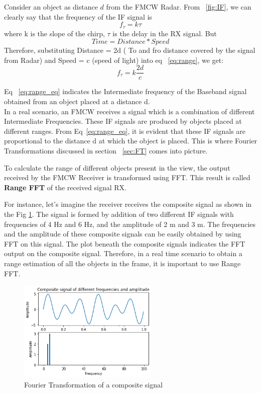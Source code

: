 Consider an object as distance $d$ from the FMCW Radar. From ~\ref{fig:IF}, we can clearly say that the frequency of the IF signal is 
\begin{equation}\label{eq:range}
    f_{\tau}= k\tau
\end{equation}
where k is the slope of the chirp, $\tau$ is the delay in the RX signal.
But 
\begin{equation}
    Time = Distance*Speed
\end{equation}
Therefore, substituting Distance = 2d ( To and fro distance covered by the signal from Radar) and Speed = c (speed of light) into eq ~\ref{eq:range}, we get:
\begin{equation}\label{eq:range_eq}
f_{\tau}= k\frac{2d}{c}   
\end{equation}

Eq ~\ref{eq:range_eq} indicates the Intermediate frequency of the Baseband signal obtained from an object placed at a distance d.
\\


In a real scenario, an FMCW receives a signal which is a combination of different Intermediate Frequencies. These IF signals are produced by objects placed at different ranges. From Eq~\ref{eq:range_eq}, it is evident that these IF signals are proportional to the distance d at which the object is placed.
This is where Fourier Transformations discussed in section ~\ref{sec:FT} comes into picture.

To calculate the range of different objects present in the view, the output received by the FMCW Receiver is transformed using FFT. This result is called \textbf{Range FFT} of the received signal RX.

For instance, let's imagine the receiver receives the composite signal as shown in the Fig \ref{fig:comp_fft}. The signal is formed by addition of two different IF signals with frequencies of 4 Hz and 6 Hz, and the amplitude of 2 m and 3 m.
The frequencies and the amplitude of these composite signals can be easily obtained by using FFT on this signal. The plot beneath the composite signals indicates the FFT output on the composite signal.
Therefore, in a real time scenario to obtain a range estimation of all the objects in the frame, it is important to use Range FFT.
 \begin{figure}[ht]
  \begin{center}
    \includegraphics[width=0.6\textwidth]{Master's thesis/images/comp_fft.png} 
    \caption{Fourier Transformation of a composite signal}
    \label{fig:comp_fft}
  \end{center}
\end{figure}  

